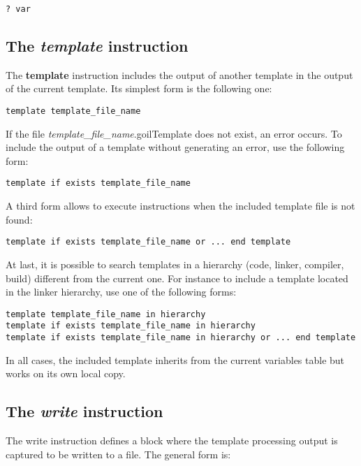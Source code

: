 \begin{lstlisting}[frame=single]
? var
\end{lstlisting}

\subsection{The {\em template} instruction}

The {\bf template} instruction includes the output of another template in the output of the current template. Its simplest form is the following one:

\begin{lstlisting}[frame=single]
template template_file_name
\end{lstlisting}

If the file {\em template\_file\_name}.goilTemplate does not exist, an error occurs. To include the output of a template without generating an error, use the following form:

\begin{lstlisting}[frame=single]
template if exists template_file_name
\end{lstlisting}

A third form allows to execute instructions when the included template file is not found:

\begin{lstlisting}[frame=single]
template if exists template_file_name or ... end template
\end{lstlisting}

At last, it is possible to search templates in a hierarchy (code, linker, compiler, build) different from the current one. For instance to include a template located in the linker hierarchy, use one of the following forms:

\begin{lstlisting}[frame=single]
template template_file_name in hierarchy
template if exists template_file_name in hierarchy
template if exists template_file_name in hierarchy or ... end template
\end{lstlisting}


In all cases, the included template inherits from the current variables table but works on its own local copy.

\subsection{The {\em write} instruction}

The write instruction defines a block where the template processing output is captured to be written to a file. The general form is:

